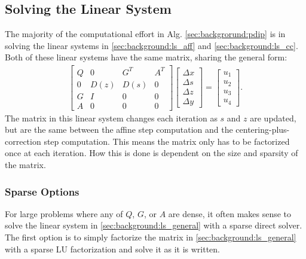 \subsection{Solving the Linear System}
\label{sec:background:solve_ls}
%
%
The majority of the computational effort in Alg. \ref{sec:backgrorund:pdip} is in solving the linear systems in \eqref{sec:background:ls_aff} and \eqref{sec:background:ls_cc}. Both of these linear systems have the same matrix, sharing the general form:
\begin{align}
    \begin{bmatrix}
        Q & 0 & G^{T} & A^{T} \\
        0 & D(z) & D(s) & 0 \\
        G & I & 0 & 0 \\
        A & 0 & 0 & 0
    \end{bmatrix} 
    \begin{bmatrix}
        \Delta x \\
        \Delta s \\
        \Delta z \\
        \Delta y
    \end{bmatrix}
    = \begin{bmatrix}
        u_1 \\ u_2 \\ u_3 \\ u_4
        \end{bmatrix}. \label{sec:background:ls_general}
\end{align}
The matrix in this linear system changes each iteration as $s$ and $z$ are updated, but are the same between the affine step computation and the centering-plus-correction step computation. This means the matrix only has to be factorized once at each iteration. How this is done is dependent on the size and sparsity of the matrix.
%
\subsubsection{Sparse Options}
%
For large problems where any of $Q$, $G$, or $A$ are dense, it often makes sense to solve the linear system in \eqref{sec:background:ls_general} with a sparse direct solver. The first option is to simply factorize the matrix in \eqref{sec:background:ls_general} with a sparse LU factorization and solve it as it is written. 

